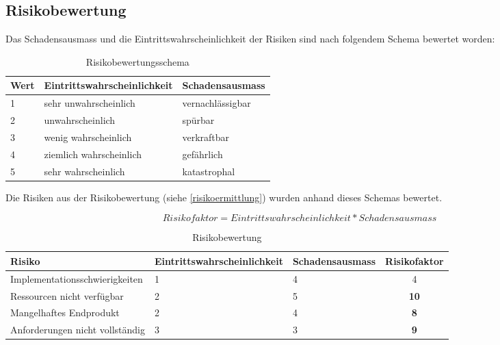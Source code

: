 \subsection{Risikobewertung}
Das Schadensausmass und die Eintrittswahrscheinlichkeit der Risiken sind nach folgendem Schema bewertet worden:

\begin{table}[ht]
\centering
  \begin{tabular}{ l | p{5cm} | p{5cm} }
	\hline
	\rowcolor{gray}
	Wert							&	Eintrittswahrscheinlichkeit	&	Schadensausmass	\\ \hline
	1							&	sehr unwahrscheinlich		&	vernachlässigbar	\\ \hline
	2							&	unwahrscheinlich			&	spürbar		\\ \hline
	3							&	wenig wahrscheinlich		&	verkraftbar		\\ \hline
	4							&	ziemlich wahrscheinlich		&	gefährlich		\\ \hline
	5							&	sehr wahrscheinlich			&	katastrophal		\\ \hline
  \end{tabular}
   \caption{Risikobewertungsschema}
\end{table}

\FloatBarrier
Die Risiken aus der Risikobewertung (siehe \ref{risikoermittlung}) wurden anhand dieses Schemas bewertet.

\begin{equation*}
Risikofaktor = Eintrittswahrscheinlichkeit * Schadensausmass
\end{equation*}

\begin{table}[ht]
\centering
  \begin{tabular}{ l | p{4cm} | p{3cm} | c }
	\hline
	\rowcolor{gray}
	Risiko							&	Eintrittswahrscheinlichkeit	&	Schadensausmass 	&	Risikofaktor\\ \hline
	Implementationsschwierigkeiten			&	1					&	4			&	4		\\ \hline
	Ressourcen nicht verfügbar			&	2					&	5			&	\textbf{10}	\\ \hline
	Mangelhaftes Endprodukt				&	2					&	4			&	\textbf{8}	\\ \hline
	Anforderungen nicht vollständig			&	3					&	3			&	\textbf{9}	\\ \hline
  \end{tabular}
   \caption{Risikobewertung}
\end{table}

